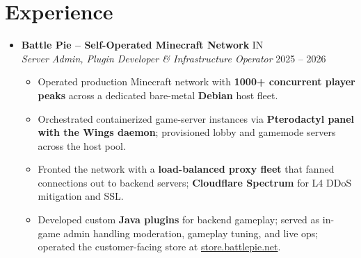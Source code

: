 \documentclass[11pt,letterpaper]{article}
\begin{document}
\section*{Experience}
\begin{itemize}
\item \textbf{Battle Pie -- Self-Operated Minecraft Network} \hfill IN \\
\textit{Server Admin, Plugin Developer \& Infrastructure Operator} \hfill 2025 -- 2026
\begin{itemize}
\item Operated production Minecraft network with \textbf{1000+ concurrent player peaks} across a dedicated bare-metal \textbf{Debian} host fleet.
\item Orchestrated containerized game-server instances via \textbf{Pterodactyl panel with the Wings daemon}; provisioned lobby and gamemode servers across the host pool.
\item Fronted the network with a \textbf{load-balanced proxy fleet} that fanned connections out to backend servers; \textbf{Cloudflare Spectrum} for L4 DDoS mitigation and SSL.
\item Developed custom \textbf{Java plugins} for backend gameplay; served as in-game admin handling moderation, gameplay tuning, and live ops; operated the customer-facing store at \href{https://store.battlepie.net}{store.battlepie.net}.
\end{itemize}
\end{itemize}
\end{document}
